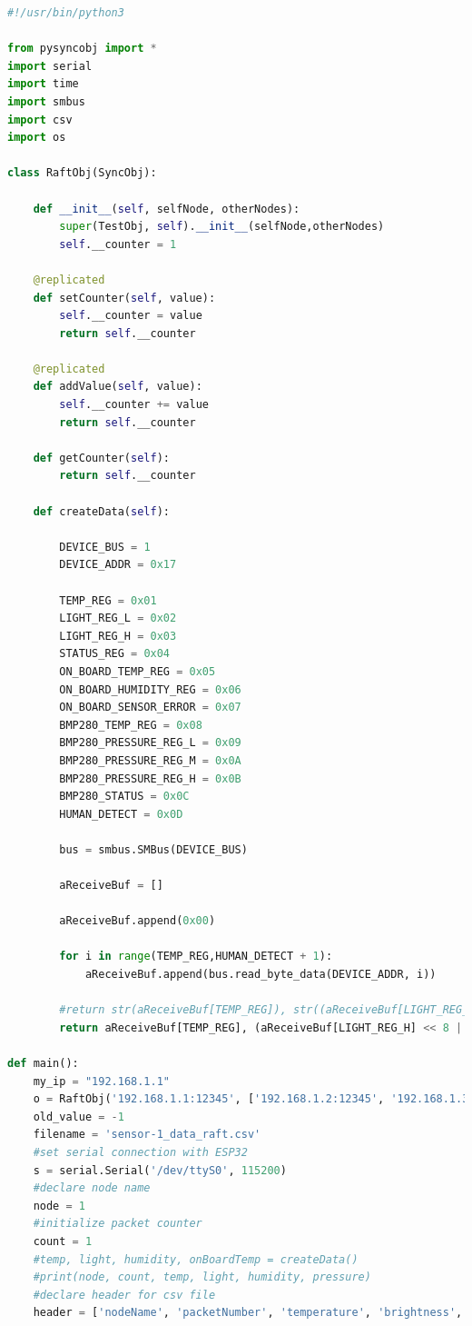 \documentclass[oneside,12pt]{book}
\begin{document}
\begin{lstlisting}[language={Python}, caption={Raft Sender code - Python3},captionpos=b, label={lst:raft_sender}]
#!/usr/bin/python3

from pysyncobj import *
import serial
import time
import smbus
import csv
import os

class RaftObj(SyncObj):

    def __init__(self, selfNode, otherNodes):
        super(TestObj, self).__init__(selfNode,otherNodes)
        self.__counter = 1

    @replicated
    def setCounter(self, value):
        self.__counter = value		
        return self.__counter

    @replicated
    def addValue(self, value):
        self.__counter += value
        return self.__counter

    def getCounter(self):
        return self.__counter
        
    def createData(self):
        
        DEVICE_BUS = 1
        DEVICE_ADDR = 0x17

        TEMP_REG = 0x01
        LIGHT_REG_L = 0x02
        LIGHT_REG_H = 0x03
        STATUS_REG = 0x04
        ON_BOARD_TEMP_REG = 0x05
        ON_BOARD_HUMIDITY_REG = 0x06
        ON_BOARD_SENSOR_ERROR = 0x07
        BMP280_TEMP_REG = 0x08
        BMP280_PRESSURE_REG_L = 0x09
        BMP280_PRESSURE_REG_M = 0x0A
        BMP280_PRESSURE_REG_H = 0x0B
        BMP280_STATUS = 0x0C
        HUMAN_DETECT = 0x0D

        bus = smbus.SMBus(DEVICE_BUS)

        aReceiveBuf = []

        aReceiveBuf.append(0x00)

        for i in range(TEMP_REG,HUMAN_DETECT + 1):
            aReceiveBuf.append(bus.read_byte_data(DEVICE_ADDR, i))

        #return str(aReceiveBuf[TEMP_REG]), str((aReceiveBuf[LIGHT_REG_H] << 8 | aReceiveBuf[LIGHT_REG_L])), str(aReceiveBuf[ON_BOARD_HUMIDITY_REG]), str((aReceiveBuf[BMP280_PRESSURE_REG_L] | aReceiveBuf[BMP280_PRESSURE_REG_M] << 8 | aReceiveBuf[BMP280_PRESSURE_REG_H] << 16))
        return aReceiveBuf[TEMP_REG], (aReceiveBuf[LIGHT_REG_H] << 8 | aReceiveBuf[LIGHT_REG_L]), aReceiveBuf[ON_BOARD_HUMIDITY_REG], aReceiveBuf[ON_BOARD_TEMP_REG]
        
def main():
    my_ip = "192.168.1.1"
    o = RaftObj('192.168.1.1:12345', ['192.168.1.2:12345', '192.168.1.3:12345'])
    old_value = -1
    filename = 'sensor-1_data_raft.csv'
    #set serial connection with ESP32
    s = serial.Serial('/dev/ttyS0', 115200)
    #declare node name
    node = 1
    #initialize packet counter
    count = 1
    #temp, light, humidity, onBoardTemp = createData()
    #print(node, count, temp, light, humidity, pressure)
    #declare header for csv file
    header = ['nodeName', 'packetNumber', 'temperature', 'brightness', 'humidity', 'onBoardTemp']  
   

\end{lstlisting}
\end{document}
